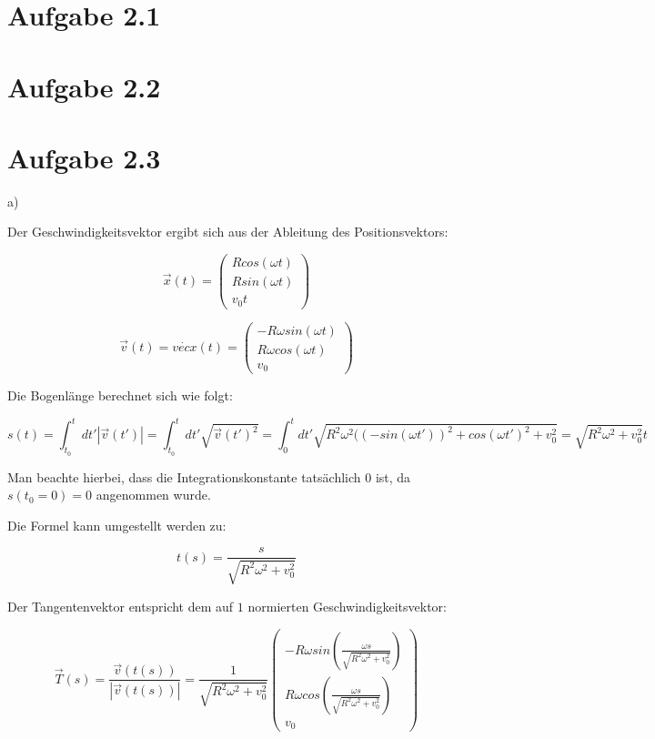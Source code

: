 \documentclass{theozettel}
\begin{document}

\section*{Aufgabe 2.1}

\newpage
\section{Aufgabe 2.2}


\newpage
\section*{Aufgabe 2.3}

a)

Der Geschwindigkeitsvektor ergibt sich aus der Ableitung des Positionsvektors:

$$
\vec{x}(t) = \begin{pmatrix}
R cos(\omega t) \\
R sin(\omega t) \\
v_0 t
\end{pmatrix}
$$

$$
\vec{v	}(t) = \dot{vec{x}}(t) = \begin{pmatrix}
- R \omega sin(\omega t) \\
R \omega cos(\omega t) \\
v_0
\end{pmatrix}
$$

Die Bogenlänge berechnet sich wie folgt:

$$
s(t) =  \int_{t_0}^{t} d t' | \vec{v}(t') | = \int_{t_0}^{t} d t' \sqrt{\vec{v}(t')^{2}} = \int_{0}^{t} d t' \sqrt{R^{2}\omega^{2} ((-sin(\omega t'))^{2} + cos(\omega t')^{2} + v_0^{2}} = \sqrt{R^{2} \omega^{2} + v_0^{2}} t
$$

Man beachte hierbei, dass die Integrationskonstante tatsächlich $0$ ist, da $s(t_0 = 0) = 0$ angenommen wurde.

Die Formel kann umgestellt werden zu:

$$
t(s) = \frac{s}{\sqrt{R^{2} \omega^{2} + v_0^{2}}}
$$

Der Tangentenvektor entspricht dem auf $1$ normierten Geschwindigkeitsvektor:

$$
\vec{T}(s) = \frac{\vec{v}(t(s))}{|\vec{v}(t(s))|} = \frac{1}{\sqrt{R^{2} \omega^{2} + v_0^{2}}} \begin{pmatrix}
- R \omega sin(\frac{\omega s}{\sqrt{R^{2} \omega^{2} + v_0^{2}}}) \\
R \omega cos(\frac{\omega s}{\sqrt{R^{2} \omega^{2} + v_0^{2}}}) \\
v_0
\end{pmatrix}
$$
\end{document}
